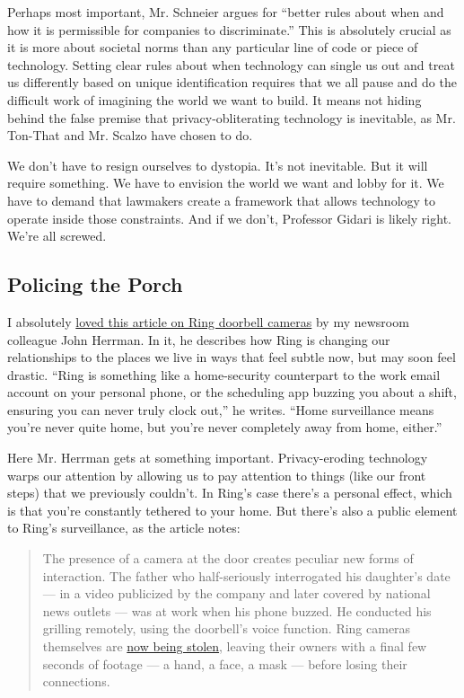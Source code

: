 Perhaps most important, Mr. Schneier argues for ``better rules about
when and how it is permissible for companies to discriminate.'' This is
absolutely crucial as it is more about societal norms than any
particular line of code or piece of technology. Setting clear rules
about when technology can single us out and treat us differently based
on unique identification requires that we all pause and do the difficult
work of imagining the world we want to build. It means not hiding behind
the false premise that privacy-obliterating technology is inevitable, as
Mr. Ton-That and Mr. Scalzo have chosen to do.

We don't have to resign ourselves to dystopia. It's not inevitable. But
it will require something. We have to envision the world we want and
lobby for it. We have to demand that lawmakers create a framework that
allows technology to operate inside those constraints. And if we don't,
Professor Gidari is likely right. We're all screwed.

\hypertarget{policing-the-porch}{%
\subsection{Policing the Porch}\label{policing-the-porch}}

I absolutely
\href{https://www.nytimes.com/2020/01/19/style/ring-video-doorbell-home-security.html}{loved
this article on Ring doorbell cameras} by my newsroom colleague John
Herrman. In it, he describes how Ring is changing our relationships to
the places we live in ways that feel subtle now, but may soon feel
drastic. ``Ring is something like a home-security counterpart to the
work email account on your personal phone, or the scheduling app buzzing
you about a shift, ensuring you can never truly clock out,'' he writes.
``Home surveillance means you're never quite home, but you're never
completely away from home, either.''

Here Mr. Herrman gets at something important. Privacy-eroding technology
warps our attention by allowing us to pay attention to things (like our
front steps) that we previously couldn't. In Ring's case there's a
personal effect, which is that you're constantly tethered to your home.
But there's also a public element to Ring's surveillance, as the article
notes:

\begin{quote}
The presence of a camera at the door creates peculiar new forms of
interaction. The father who half-seriously interrogated his daughter's
date --- in a video publicized by the company and later covered by
national news outlets --- was at work when his phone buzzed. He
conducted his grilling remotely, using the doorbell's voice function.
Ring cameras themselves are
\href{https://chicago.cbslocal.com/2019/12/19/ring-home-camera-thefts/}{now
being stolen}, leaving their owners with a final few seconds of footage
--- a hand, a face, a mask --- before losing their connections.
\end{quote}

